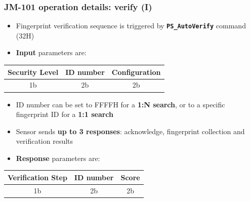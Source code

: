 \documentclass[handout]{beamer}
\begin{document}
\begin{frame}
  \frametitle{JM-101 operation details: verify (I)}

  \begin{itemize}
    \item Fingerprint verification sequence is triggered by
          \textbf{\texttt{PS\_AutoVerify}} command (32H)
    \item \textbf{Input} parameters are:
  \end{itemize}

  \begin{table}
    \centering
    \footnotesize
    \begin{tabular}{ccc}
      \toprule
      Security Level & ID number & Configuration \\
      \midrule
      1b             & 2b        & 2b            \\
      \bottomrule
    \end{tabular}
  \end{table}

  \begin{itemize}
    \item ID number can be set to FFFFH for a \textbf{1:N search}, or to a
          specific fingerprint ID for a \textbf{1:1 search}
    \item Sensor sends \textbf{up to 3 responses}: acknowledge, fingerprint
          collection and verification results
    \item \textbf{Response} parameters are:
  \end{itemize}

  \begin{table}
    \centering
    \footnotesize
    \begin{tabular}{ccc}
      \toprule
      Verification Step & ID number & Score \\
      \midrule
      1b                & 2b        & 2b    \\
      \bottomrule
    \end{tabular}
  \end{table}
\end{frame}
\end{document}

